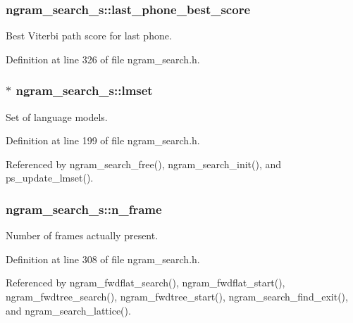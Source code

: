 \subsubsection[{last\-\_\-phone\-\_\-best\-\_\-score}]{ {\bf ngram\-\_\-search\-\_\-s\-::last\-\_\-phone\-\_\-best\-\_\-score}}\label{structngram__search__s_a81ee45f3c184568e2b5f8b79c58e0b9e}


\-Best \-Viterbi path score for last phone. 



\-Definition at line 326 of file ngram\-\_\-search.\-h.

\subsubsection[{lmset}]{$\ast$ {\bf ngram\-\_\-search\-\_\-s\-::lmset}}\label{structngram__search__s_a6127a6d8fb53832e67456c11aa6ad9c4}


\-Set of language models. 



\-Definition at line 199 of file ngram\-\_\-search.\-h.



\-Referenced by ngram\-\_\-search\-\_\-free(), ngram\-\_\-search\-\_\-init(), and ps\-\_\-update\-\_\-lmset().

\subsubsection[{n\-\_\-frame}]{ {\bf ngram\-\_\-search\-\_\-s\-::n\-\_\-frame}}\label{structngram__search__s_a5255e56d28c239a4e1d9b1721e8a2f8d}


\-Number of frames actually present. 



\-Definition at line 308 of file ngram\-\_\-search.\-h.



\-Referenced by ngram\-\_\-fwdflat\-\_\-search(), ngram\-\_\-fwdflat\-\_\-start(), ngram\-\_\-fwdtree\-\_\-search(), ngram\-\_\-fwdtree\-\_\-start(), ngram\-\_\-search\-\_\-find\-\_\-exit(), and ngram\-\_\-search\-\_\-lattice().

